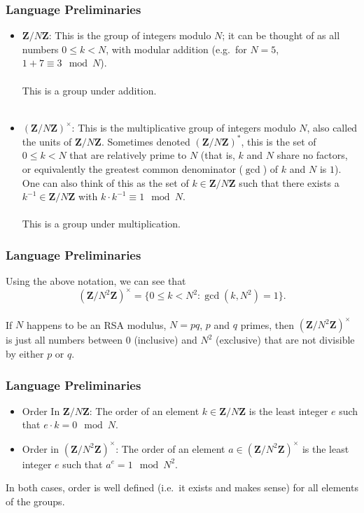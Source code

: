 \documentclass{beamer}
\makeatletter
\newcommand{\Z}{\ensuremath{\mathbf{Z}}}
\newcommand{\zmodn}{\ensuremath{\Z/N\Z}}
\newcommand{\zmodntunits}{\ensuremath{\left(\Z/N^{2}\Z\right)^{\times}}}
\DeclareRobustCommand*{\&}{%
  \nfss@text{%
    \fontfamily{LinuxBiolinumT-TLF}%
    \selectfont
    \symbol{`\&}%
  }%
}
\makeatother
\begin{document}
\begin{frame}
  \frametitle{Language Preliminaries}
  \begin{itemize}
    \item \zmodn: This is the group of integers modulo $N$; it can be thought of
      as all numbers $0\leq k < N$, with modular addition (e.g.\ for $N=5$,
      $1+7 \equiv 3\mod N$).\\~\\ This is a group under addition.\\~\\
    \item $(\zmodn)^\times$: This is the multiplicative group of integers modulo
      $N$, also called the units of $\zmodn$. Sometimes denoted
      $(\mathbf{Z}/N\mathbf{Z})^*$, this is the set of $0\leq k < N$ that are
      relatively prime to $N$ (that is, $k$ and $N$ share no factors, or
      equivalently the greatest common denominator ($\gcd$) of $k$ and $N$ is $1$). One
      can also think of this as the set of $k\in\zmodn$ such that there exists
      a $k^{-1}\in\zmodn$ with $k\cdot k^{-1} \equiv 1\mod N$.\\~\\
      This is a group under multiplication.
  \end{itemize}
\end{frame}

\begin{frame}
  \frametitle{Language Preliminaries}
Using the above notation, we can see that 
\begin{equation*}
  \zmodntunits = \{0\leq k<N^2: \gcd(k,N^2) = 1\}.
\end{equation*}~\\
If $N$ happens to be an RSA modulus,
$N=pq$, $p$ and $q$ primes, then $\zmodntunits$ is just all numbers between $0$
(inclusive) and $N^2$ (exclusive) that are not divisible by either $p$ or
$q$.
\end{frame}

\begin{frame}
  \frametitle{Language Preliminaries}
  \begin{itemize}
    \item Order In \zmodn: The order of an element $k\in\zmodn$ is the least integer $e$
      such that $e\cdot k = 0\mod N$.
    \item Order in \zmodntunits: The order of an element $a\in\zmodntunits$ is
      the least integer $e$ such that $a^e = 1\mod N^2$.
  \end{itemize}
  In both cases, order is well defined (i.e.\ it exists and makes sense) for
  all elements of the groups.
\end{frame}
\end{document}
